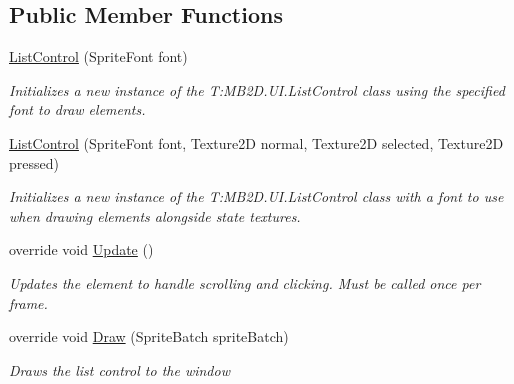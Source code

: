 \subsection*{Public Member Functions}
\begin{DoxyCompactItemize}
\item 
\hyperlink{class_m_b2_d_1_1_u_i_1_1_list_control_a7248e2ea186e805d76e9c6c84986f85c}{List\+Control} (Sprite\+Font font)
\begin{DoxyCompactList}\small\item\em Initializes a new instance of the T\+:\+M\+B2\+D.\+U\+I.\+List\+Control class using the specified font to draw elements. \end{DoxyCompactList}\item 
\hyperlink{class_m_b2_d_1_1_u_i_1_1_list_control_af89e91c17451a74cb0edbada9a1c0d17}{List\+Control} (Sprite\+Font font, Texture2D normal, Texture2D selected, Texture2D pressed)
\begin{DoxyCompactList}\small\item\em Initializes a new instance of the T\+:\+M\+B2\+D.\+U\+I.\+List\+Control class with a font to use when drawing elements alongside state textures. \end{DoxyCompactList}\item 
override void \hyperlink{class_m_b2_d_1_1_u_i_1_1_list_control_a48587bc052ca0d3d28bd968369024e14}{Update} ()
\begin{DoxyCompactList}\small\item\em Updates the element to handle scrolling and clicking. Must be called once per frame. \end{DoxyCompactList}\item 
override void \hyperlink{class_m_b2_d_1_1_u_i_1_1_list_control_a2ec92a77d8960945f3bd37bd76641946}{Draw} (Sprite\+Batch sprite\+Batch)
\begin{DoxyCompactList}\small\item\em Draws the list control to the window \end{DoxyCompactList}\end{DoxyCompactItemize}
